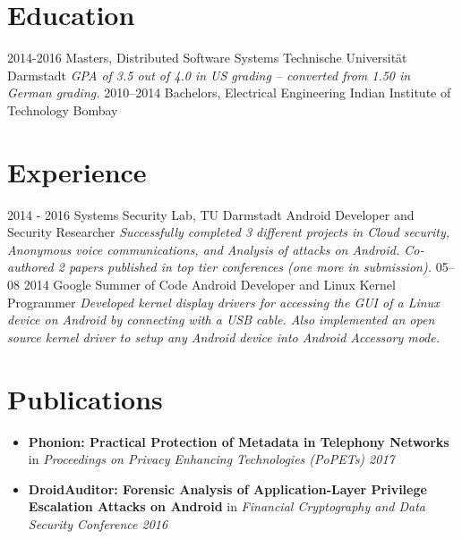 \documentclass[]{friggeri-cv}
\begin{document}
\section{Education}
\begin{entrylist}
  \entry
    {2014-2016}
    {Masters, {\normalfont Distributed Software Systems}}
    {Technische Universität Darmstadt}
    {\emph{GPA of 3.5 out of 4.0 in US grading -- converted from 1.50 in German grading.}}
  \entry
    {2010–2014}
    {Bachelors, {\normalfont Electrical Engineering}}
    {Indian Institute of Technology Bombay}
    {}%
\end{entrylist}

\section{Experience}
\begin{entrylist}
  \entry
    {2014 - 2016}
    {Systems Security Lab, TU Darmstadt}
    {Android Developer and Security Researcher}
    {\emph{Successfully completed 3 different projects in Cloud security, Anonymous voice communications, and Analysis of attacks on Android. Co-authored 2 papers published in top tier conferences (one more in submission).}}
  \entry
    {05–08 2014}
    {Google Summer of Code}
    {Android Developer and Linux Kernel Programmer}
    {\emph{Developed kernel display drivers for accessing the GUI of a Linux device on Android by connecting with a USB cable. Also implemented an open source kernel driver to setup any Android device into Android Accessory mode.}}
\end{entrylist}

\section{Publications}
\begin{itemize}
  \item \textbf{Phonion: Practical Protection of Metadata in Telephony Networks} in \textit{Proceedings on Privacy Enhancing Technologies (PoPETs) 2017}
  \item \textbf{DroidAuditor: Forensic Analysis of Application-Layer Privilege Escalation Attacks on Android} in \textit{Financial Cryptography and Data Security Conference 2016}
\end{itemize}
~
\end{document}
